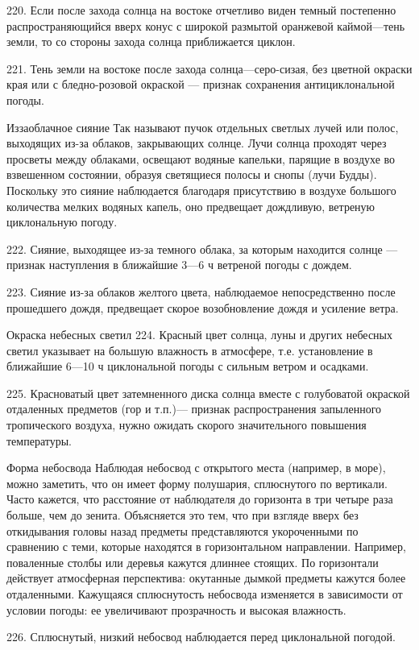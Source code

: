 220. Если после захода солнца на востоке отчетливо виден темный постепенно распространяющийся вверх конус с широкой размытой оранжевой каймой—тень земли, то со стороны захода солнца приближается циклон.

221. Тень земли на востоке после захода солнца—серо-сизая, без цветной окраски края или с бледно-розовой окраской — признак сохранения антициклональной погоды.

Иззаоблачное сияние
Так называют пучок отдельных светлых лучей или полос, выходящих из-за облаков, закрывающих солнце. Лучи солнца проходят через просветы между облаками, освещают водяные капельки, парящие в воздухе во взвешенном состоянии, образуя светящиеся полосы и снопы (лучи Будды). Поскольку это сияние наблюдается благодаря присутствию в воздухе большого количества мелких водяных капель, оно предвещает дождливую, ветреную циклональную погоду.

222. Сияние, выходящее из-за темного облака, за которым находится солнце — признак наступления в ближайшие 3—6 ч ветреной погоды с дождем.

223. Сияние из-за облаков желтого цвета, наблюдаемое непосредственно после прошедшего дождя, предвещает скорое возобновление дождя и усиление ветра.

Окраска небесных светил
224. Красный цвет солнца, луны и других небесных светил указывает на большую влажность в атмосфере, т.е. установление в ближайшие 6—10 ч циклональной погоды с сильным ветром и осадками.

225. Красноватый цвет затемненного диска солнца вместе с голубоватой окраской отдаленных предметов (гор и т.п.)— признак распространения запыленного тропического воздуха, нужно ожидать скорого значительного повышения температуры.

Форма небосвода
Наблюдая небосвод с открытого места (например, в море), можно заметить, что он имеет форму полушария, сплюснутого по вертикали. Часто кажется, что расстояние от наблюдателя до горизонта в три четыре раза больше, чем до зенита. Объясняется это тем, что при взгляде вверх без откидывания головы назад предметы представляются укороченными по сравнению с теми, которые находятся в горизонтальном направлении.
Например, поваленные столбы или деревья кажутся длиннее стоящих. По горизонтали действует атмосферная перспектива: окутанные дымкой предметы кажутся более отдаленными. Кажущаяся сплюснутость небосвода изменяется в зависимости от условии погоды: ее увеличивают прозрачность и высокая влажность.

226. Сплюснутый, низкий небосвод наблюдается перед циклональной погодой.

